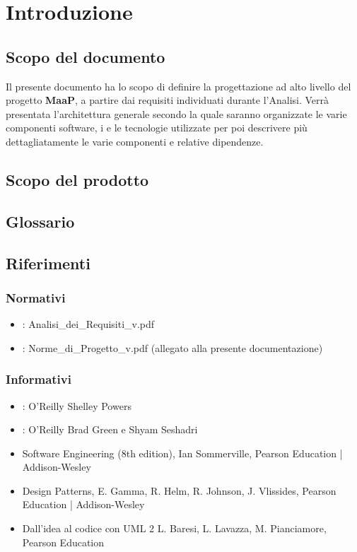 \newpage
\section{Introduzione}
\subsection{Scopo del documento}
Il presente documento ha lo scopo di definire la progettazione ad alto livello del progetto \textbf{MaaP}, a partire dai requisiti individuati durante l'Analisi. Verrà presentata l'architettura generale secondo la quale saranno organizzate le varie componenti software, i  e le tecnologie utilizzate per poi descrivere più dettagliatamente le varie componenti e relative dipendenze.

\subsection{Scopo del prodotto}
\Prodotto{}

\subsection{Glossario}
\Glossario{}

\subsection{Riferimenti}

\subsubsection{Normativi}
\begin{itemize}
\item {}: Analisi\_{}dei\_{}Requisiti\_{}v\versioneAnalisiDeiRequisiti{}.pdf
\item {}: Norme\_{}di\_{}Progetto\_{}v\versioneNormeDiProgetto{}.pdf  (allegato alla presente documentazione)\\
\end{itemize}

\subsubsection{Informativi}
\begin{itemize}
\item {}: O'Reilly Shelley Powers
\item {}: O'Reilly Brad Green e Shyam Seshadri
\item Software Engineering (8th edition), Ian Sommerville, Pearson Education | Addison-Wesley
\item Design Patterns, E. Gamma, R. Helm, R. Johnson, J. Vlissides, Pearson Education | Addison-Wesley
\item Dall'idea al codice con UML 2       L. Baresi, L. Lavazza, M. Pianciamore, Pearson Education
\end{itemize}

